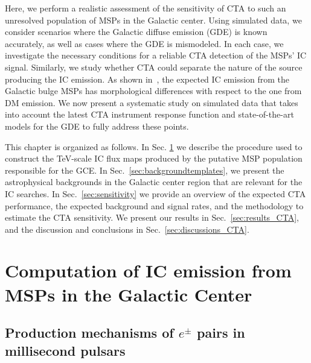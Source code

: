 \documentclass[doublespace,nopageskip]{VTthesis} %
\begin{document}
Here, we perform a realistic assessment of the sensitivity of CTA to such an unresolved population of MSPs in the Galactic center. Using simulated data, we consider scenarios where the Galactic diffuse emission (GDE) is known accurately, as well as cases where the GDE is mismodeled. In each case, we investigate the necessary conditions for a reliable CTA detection of the MSPs' IC signal. Similarly, we study whether CTA could separate the nature of the source producing the IC emission. As shown in~\citet{2019PhRvD..99l3020S}, the expected IC emission from the Galactic bulge MSPs has morphological differences with respect to the one from DM emission. We now present a systematic study on simulated data that takes into account the latest CTA instrument response function and state-of-the-art models for the GDE to fully address these points.
 
This chapter is organized as follows. In Sec. \ref{sec:ICfromMSPs} we describe the procedure used to construct the TeV-scale IC flux maps produced by the putative MSP population responsible for the GCE. In Sec.~\ref{sec:backgroundtemplates}, we present the astrophysical backgrounds in the Galactic center region that are relevant for the IC searches. In Sec.~\ref{sec:sensitivity} we provide an overview of the expected CTA performance, the expected background and signal rates, and the methodology to estimate the CTA sensitivity. We present our results in Sec.~\ref{sec:results_CTA}, and the discussion and conclusions in Sec.~\ref{sec:discussions_CTA}. 
 
 

\section{Computation of IC emission from MSPs in the Galactic Center}
\label{sec:ICfromMSPs}


\subsection{Production mechanisms of $e^{\pm}$ pairs in millisecond pulsars}
\label{subsec:e+-injection}
\end{document}
